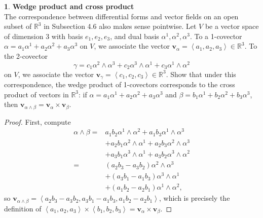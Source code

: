 \documentclass[12pt]{article}
\theoremstyle{definition}
\newtheorem{ex}{}[section]
\begin{document}
\begin{ex}
	\textbf{Wedge product and cross product} \\
	The correspondence between differential forms and vector fields on an open subset of $\mathbb{R}^3$ in Subsection 4.6 also makes sense pointwise.
	Let $V$ be a vector space of dimension 3 with basis $e_1, e_2, e_3$, and dual basis $\alpha^1, \alpha^2, \alpha^3$.
	To a 1-covector $\alpha = a_1\alpha^1 + a_2\alpha^2 + a_3\alpha^3$ on $V$, we associate the vector $\mathbf{v}_\alpha = \left\langle a_1, a_2, a_3 \right\rangle \in \mathbb{R}^3$.
	To the 2-covector \begin{equation*}
		\gamma = c_1 \alpha^2 \wedge \alpha^3 + c_2 \alpha^3 \wedge \alpha^1 + c_3 \alpha^1 \wedge \alpha^2
	\end{equation*}
	on $V$, we associate the vector $\mathbf{v}_\gamma = \left\langle c_1, c_2, c_3 \right\rangle \in \mathbb{R}^3$.
	Show that under this correspondence, the wedge product of 1-covectors corresponds to the cross product of vectors in $\mathbb{R}^3$: if $\alpha = a_1 \alpha^1 + a_2 \alpha^2 + a_3\alpha^3$ and $\beta = b_1 \alpha^1 + b_2 \alpha^2 + b_3 \alpha^3$, then $\mathbf{v}_{\alpha \wedge \beta} = \mathbf{v}_\alpha \times \mathbf{v}_\beta$.
\end{ex}
\begin{proof}
	First, compute
	\begin{align*}
		\alpha \wedge \beta  = {} & a_1 b_2 \alpha^1 \wedge \alpha^2 + a_1 b_3 \alpha^1 \wedge \alpha^3 \\
		                          & +a_2b_1\alpha^2 \wedge \alpha^1 + a_2b_3 \alpha^2 \wedge \alpha^3   \\
		                          & +a_3b_1 \alpha^3 \wedge \alpha^1 + a_3 b_2 \alpha^3 \wedge \alpha^2 \\
		= {}                      & (a_2b_3 - a_3b_2)\alpha^2 \wedge \alpha^3                           \\
		                          & +(a_3 b_1 - a_1b_3)\alpha^3 \wedge \alpha^1                         \\
		                          & +(a_1b_2 - a_2b_1)\alpha^1 \wedge \alpha^2,
	\end{align*}
	so $\mathbf{v}_{\alpha \wedge \beta} = \left\langle a_2b_3 - a_3b_2, a_3b_1 - a_1b_3, a_1b_2 - a_2b_1 \right\rangle$, which is precisely the definition of $\left\langle a_1, a_2, a_3 \right\rangle \times \left\langle b_1, b_2, b_3 \right\rangle = \mathbf{v}_\alpha \times \mathbf{v}_\beta$.
\end{proof}
\end{document}
